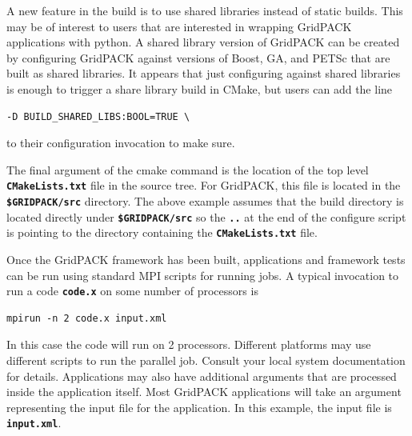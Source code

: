 A new feature in the build is to use shared libraries instead of static builds. This may be of interest to users that are interested in wrapping GridPACK applications with python. A shared library version of GridPACK can be created by configuring GridPACK against versions of Boost, GA, and PETSc that are built as shared libraries. It appears that just configuring against shared libraries is enough to trigger a share library build in CMake, but users can add the line

{
\color{red}
\begin{Verbatim}[fontseries=b]
    -D BUILD_SHARED_LIBS:BOOL=TRUE \
\end{Verbatim}
}

to their configuration invocation to make sure.

The final argument of the cmake command is the location of the top level \texttt{\textbf{CMakeLists.txt}} file in the source tree. For GridPACK, this file is located in the \texttt{\textbf{\$GRIDPACK/src}} directory. The above example assumes that the build directory is located directly under \texttt{\textbf{\$GRIDPACK/src}} so the \texttt{\textbf{..}} at the end of the configure script is pointing to the directory containing the \texttt{\textbf{CMakeLists.txt}} file.

Once the GridPACK framework has been built, applications and framework tests can be run using standard MPI scripts for running jobs. A typical invocation to run a code \texttt{\textbf{code.x}} on some number of processors is

{
\color{red}
\begin{Verbatim}[fontseries=b]
    mpirun -n 2 code.x input.xml
\end{Verbatim}
}

In this case the code will run on 2 processors. Different platforms may use different scripts to run the parallel job. Consult your local system documentation for details. Applications may also have additional arguments that are processed inside the application itself. Most GridPACK applications will take an argument representing the input file for the application. In this example, the input file is \texttt{\textbf{input.xml}}.
\newline
\hyperlink{topDoc}{\color{blue}{Top}}
